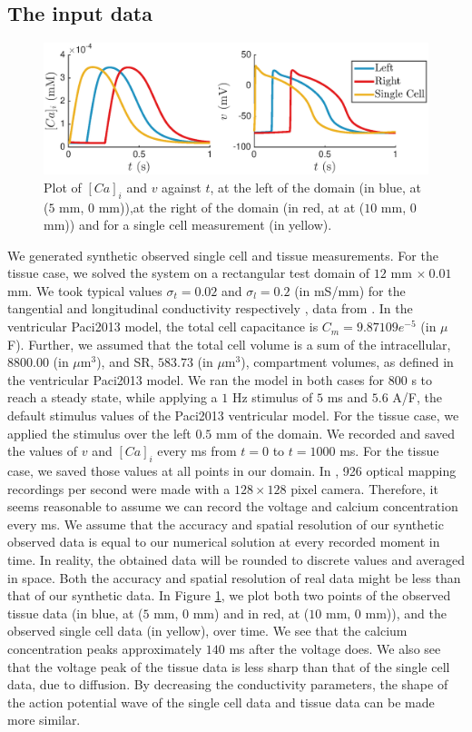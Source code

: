 \documentclass{article}
\begin{document}
\subsection{The input data} \label{The input data}
%
\begin{figure}
   \includegraphics[width=1\linewidth]{strip} 
    \caption{Plot of $[Ca]_i$ and $v$ against $t$, at the left of the domain (in blue, at ($5$ mm, $0$ mm)),at the right of the domain (in red, at at ($10$ mm, $0$ mm)) and for a single cell measurement (in yellow).}
    \label{fig:3}
\end{figure}
%
We generated synthetic observed single cell and tissue measurements. For the tissue case, we solved the system on a rectangular test domain of $12$ mm $\times\: 0.01$ mm. We took typical values $\sigma_t=0.02$ and $\sigma_l=0.2$ (in mS/mm) for the tangential and longitudinal conductivity respectively \cite{Roth}, data from \cite{Plonsey1982, Plonsey1984}. In the ventricular Paci2013 model, the total cell capacitance is $C_m=9.87109e^{-5}$ (in $\mu$F). Further, we assumed that the total cell volume is a sum of the intracellular, $8800.00$ (in $\mu$m$^3$), and SR, $583.73$ (in $\mu$m$^3$), compartment volumes, as defined in the ventricular Paci2013 model.
We ran the model in both cases for 800 s to reach a steady state, while applying a $1$ Hz stimulus of $5$ ms and $5.6$ A/F, the default stimulus values of the Paci2013 ventricular model. For the tissue case, we applied the stimulus over the left $0.5$ mm of the domain. We recorded and saved the values of $v$ and $[Ca]_i$ every ms from $t=0$ to $t=1000$ ms. For the tissue case, we saved those values at all points in our domain. In \cite{Lee2012}, 926 optical mapping recordings per second were made with a $128 \times 128$ pixel camera. Therefore, it seems reasonable to assume we can record the voltage and calcium concentration every ms. We assume that the accuracy and spatial resolution of our synthetic observed data is equal to our numerical solution at every recorded moment in time. In reality, the obtained data will be rounded to discrete values and averaged in space. Both the accuracy and spatial resolution of real data might be less than that of our synthetic data. In Figure \ref{fig:3}, we plot both two points of the observed tissue data (in blue, at ($5$ mm, $0$ mm) and in red, at ($10$ mm, $0$ mm)), and the observed single cell data (in yellow), over time. We see that the calcium concentration peaks approximately $140$ ms after the voltage does. We also see that the voltage peak of the tissue data is less sharp than that of the single cell data, due to diffusion. By decreasing the conductivity parameters, the shape of the action potential wave of the single cell data and tissue data can be made more similar.
%
\end{document}
